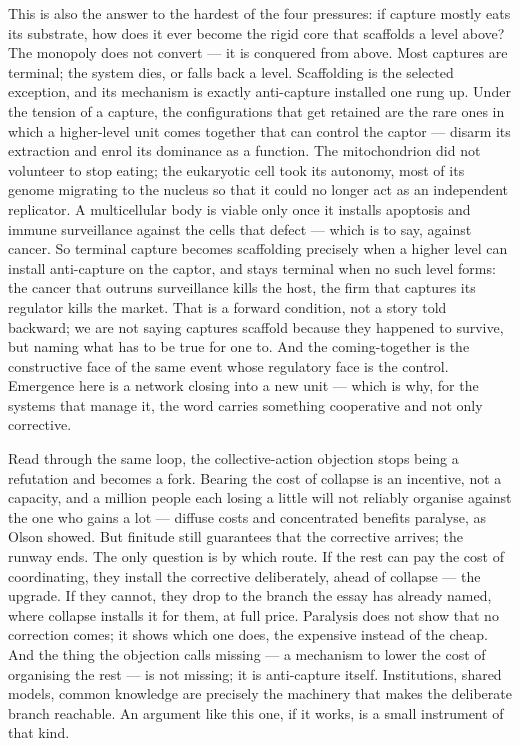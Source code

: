 \documentclass[11pt, a4paper]{report}
\begin{document}
This is also the answer to the hardest of the four pressures: if capture mostly eats its substrate, how does it ever become the rigid core that scaffolds a level above? The monopoly does not convert --- it is conquered from above. Most captures are terminal; the system dies, or falls back a level. Scaffolding is the selected exception, and its mechanism is exactly anti-capture installed one rung up. Under the tension of a capture, the configurations that get retained are the rare ones in which a higher-level unit comes together that can control the captor --- disarm its extraction and enrol its dominance as a function. The mitochondrion did not volunteer to stop eating; the eukaryotic cell took its autonomy, most of its genome migrating to the nucleus so that it could no longer act as an independent replicator. A multicellular body is viable only once it installs apoptosis and immune surveillance against the cells that defect --- which is to say, against cancer. So terminal capture becomes scaffolding precisely when a higher level can install anti-capture on the captor, and stays terminal when no such level forms: the cancer that outruns surveillance kills the host, the firm that captures its regulator kills the market. That is a forward condition, not a story told backward; we are not saying captures scaffold because they happened to survive, but naming what has to be true for one to. And the coming-together is the constructive face of the same event whose regulatory face is the control. Emergence here is a network closing into a new unit --- which is why, for the systems that manage it, the word carries something cooperative and not only corrective.

Read through the same loop, the collective-action objection stops being a refutation and becomes a fork. Bearing the cost of collapse is an incentive, not a capacity, and a million people each losing a little will not reliably organise against the one who gains a lot --- diffuse costs and concentrated benefits paralyse, as Olson showed. But finitude still guarantees that the corrective arrives; the runway ends. The only question is by which route. If the rest can pay the cost of coordinating, they install the corrective deliberately, ahead of collapse --- the upgrade. If they cannot, they drop to the branch the essay has already named, where collapse installs it for them, at full price. Paralysis does not show that no correction comes; it shows which one does, the expensive instead of the cheap. And the thing the objection calls missing --- a mechanism to lower the cost of organising the rest --- is not missing; it is anti-capture itself. Institutions, shared models, common knowledge are precisely the machinery that makes the deliberate branch reachable. An argument like this one, if it works, is a small instrument of that kind.
\end{document}
